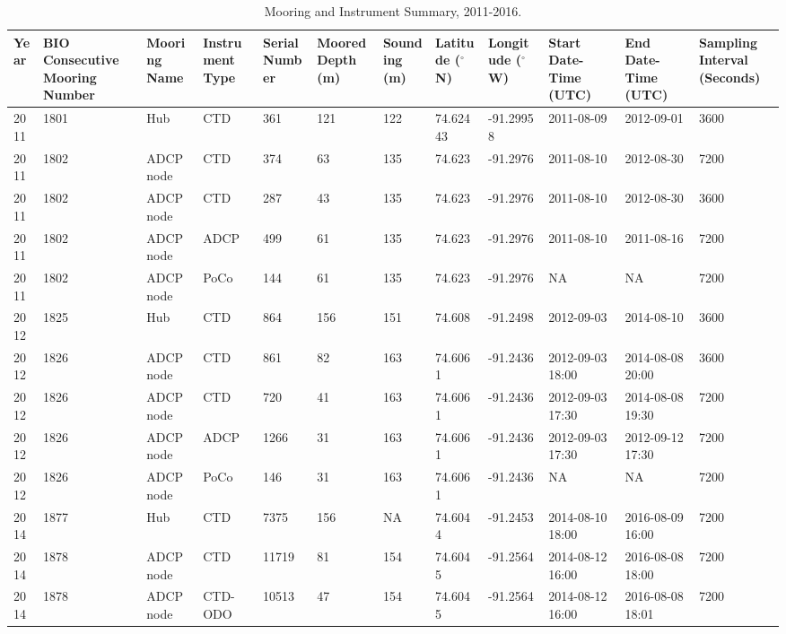 \documentclass[12pt]{dforeport}
\begin{document}
\begin{landscape}

\begin{table}[ht]
\centering
\caption[Mooring and Instrument Summary, 2011-2016]{Mooring and Instrument Summary, 2011-2016.} 
\label{t:mooringSummary}
\begin{tabular}{p{0.3in}p{.7in}p{.7in}p{.7in}p{.7in}p{.7in}p{.7in}p{.7in}p{.7in}p{.7in}p{.7in}p{.7in}}
 Year & BIO Consecutive Mooring Number & Mooring Name & Instrument Type & Serial Number & Moored Depth (m) & Sounding (m) & Latitude ($^\circ$ N) & Longitude ($^\circ$ W) & Start Date-Time (UTC) & End Date-Time (UTC) & Sampling Interval (Seconds) \\ 
\hline
2011 & 1801 & Hub & CTD & 361 & 121 & 122 & 74.62443 & -91.29958 & 2011-08-09 & 2012-09-01 & 3600 \\ 
2011 & 1802 & ADCP node & CTD & 374 & 63 & 135 & 74.623 & -91.2976 & 2011-08-10 & 2012-08-30 & 7200 \\ 
2011 & 1802 & ADCP node & CTD & 287 & 43 & 135 & 74.623 & -91.2976 & 2011-08-10 & 2012-08-30 & 3600 \\ 
2011 & 1802 & ADCP node & ADCP & 499 & 61 & 135 & 74.623 & -91.2976 & 2011-08-10 & 2011-08-16 & 7200 \\ 
2011 & 1802 & ADCP node & PoCo & 144 & 61 & 135 & 74.623 & -91.2976 & NA & NA & 7200 \\ 
2012 & 1825 & Hub & CTD & 864 & 156 & 151 & 74.608 & -91.2498 & 2012-09-03 & 2014-08-10 & 3600 \\ 
2012 & 1826 & ADCP node & CTD & 861 & 82 & 163 & 74.6061 & -91.2436 & 2012-09-03 18:00 & 2014-08-08 20:00 & 3600 \\ 
2012 & 1826 & ADCP node & CTD & 720 & 41 & 163 & 74.6061 & -91.2436 & 2012-09-03 17:30 & 2014-08-08 19:30 & 7200 \\
2012 & 1826 & ADCP node & ADCP & 1266 & 31 & 163 & 74.6061 & -91.2436 & 2012-09-03 17:30 & 2012-09-12 17:30 & 7200 \\ 
2012 & 1826 & ADCP node & PoCo & 146 & 31 & 163 & 74.6061 & -91.2436 & NA & NA & 7200 \\ 
2014 & 1877 & Hub & CTD & 7375 & 156 & NA & 74.6044 & -91.2453 & 2014-08-10 18:00 & 2016-08-09 16:00 & 7200 \\ 
2014 & 1878 & ADCP node & CTD & 11719 & 81 & 154 & 74.6045 & -91.2564 & 2014-08-12 16:00 & 2016-08-08 18:00 & 7200 \\ 
2014 & 1878 & ADCP node & CTD-ODO & 10513 & 47 & 154 & 74.6045 & -91.2564 & 2014-08-12 16:00 & 2016-08-08 18:01 & 7200 \\ 

\end{tabular}
\end{table}
\end{landscape}
\end{document}
